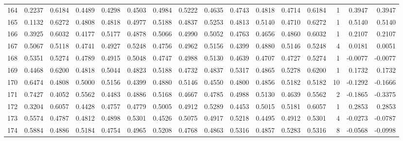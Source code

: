 \begin{tabular}{lrrrrrrrrrrrrrrr}
164 &      0.2237 &  0.6184 &  0.4489 &  0.4298 &  0.4503 &  0.4984 &  0.5222 &  0.4635 &  0.4743 &  0.4818 &   0.4714 &     0.6184 &      1 &                    0.3947 &                     0.3947 \\
165 &      0.1132 &  0.6272 &  0.4808 &  0.4818 &  0.4977 &  0.5188 &  0.4837 &  0.5253 &  0.4813 &  0.5140 &   0.4710 &     0.6272 &      1 &                    0.5140 &                     0.5140 \\
166 &      0.3925 &  0.6032 &  0.4177 &  0.5177 &  0.4878 &  0.5066 &  0.4990 &  0.5052 &  0.4763 &  0.4656 &   0.4860 &     0.6032 &      1 &                    0.2107 &                     0.2107 \\
167 &      0.5067 &  0.5118 &  0.4741 &  0.4927 &  0.5248 &  0.4756 &  0.4962 &  0.5156 &  0.4399 &  0.4880 &   0.5146 &     0.5248 &      4 &                    0.0181 &                     0.0051 \\
168 &      0.5351 &  0.5274 &  0.4789 &  0.4915 &  0.5048 &  0.4747 &  0.4988 &  0.5130 &  0.4639 &  0.4707 &   0.4727 &     0.5274 &      1 &                   -0.0077 &                    -0.0077 \\
169 &      0.4468 &  0.6200 &  0.4818 &  0.5044 &  0.4823 &  0.5188 &  0.4732 &  0.4837 &  0.5317 &  0.4865 &   0.5278 &     0.6200 &      1 &                    0.1732 &                     0.1732 \\
170 &      0.6474 &  0.4808 &  0.5000 &  0.5156 &  0.4399 &  0.4880 &  0.5146 &  0.4550 &  0.4800 &  0.4856 &   0.5182 &     0.5182 &     10 &                   -0.1292 &                    -0.1666 \\
171 &      0.7427 &  0.4052 &  0.5562 &  0.4483 &  0.4886 &  0.5168 &  0.4667 &  0.4785 &  0.4988 &  0.5130 &   0.4639 &     0.5562 &      2 &                   -0.1865 &                    -0.3375 \\
172 &      0.3204 &  0.6057 &  0.4428 &  0.4757 &  0.4779 &  0.5005 &  0.4912 &  0.5289 &  0.4453 &  0.5015 &   0.5181 &     0.6057 &      1 &                    0.2853 &                     0.2853 \\
173 &      0.5574 &  0.4787 &  0.4812 &  0.4898 &  0.5301 &  0.4526 &  0.5075 &  0.4917 &  0.5218 &  0.4495 &   0.4912 &     0.5301 &      4 &                   -0.0273 &                    -0.0787 \\
174 &      0.5884 &  0.4886 &  0.5184 &  0.4754 &  0.4965 &  0.5208 &  0.4768 &  0.4863 &  0.5316 &  0.4857 &   0.5283 &     0.5316 &      8 &                   -0.0568 &                    -0.0998 \\

\end{tabular}
